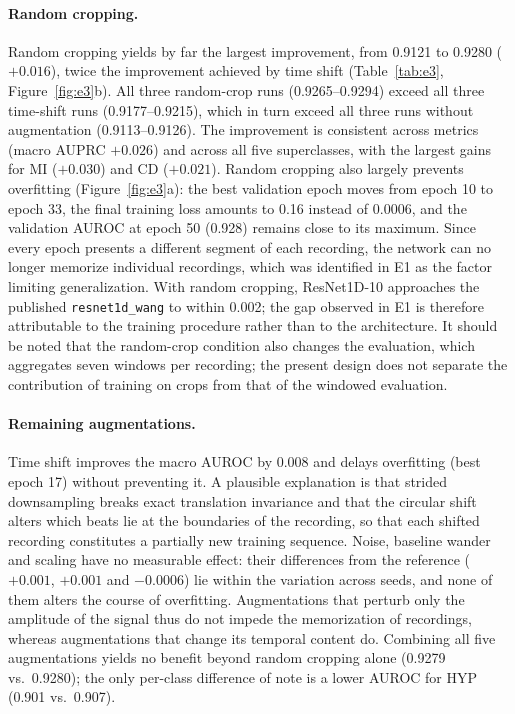 \documentclass{article}
\newcommand{\wang}{\texttt{resnet1d\_wang}}
\begin{document}
\paragraph{Random cropping.} Random cropping yields by far the largest improvement, from 0.9121 to 0.9280 ($+0.016$), twice the improvement achieved by time shift (Table~\ref{tab:e3}, Figure~\ref{fig:e3}b). All three random-crop runs (0.9265--0.9294) exceed all three time-shift runs (0.9177--0.9215), which in turn exceed all three runs without augmentation (0.9113--0.9126). The improvement is consistent across metrics (macro AUPRC $+0.026$) and across all five superclasses, with the largest gains for MI ($+0.030$) and CD ($+0.021$). Random cropping also largely prevents overfitting (Figure~\ref{fig:e3}a): the best validation epoch moves from epoch 10 to epoch 33, the final training loss amounts to 0.16 instead of 0.0006, and the validation AUROC at epoch 50 (0.928) remains close to its maximum. Since every epoch presents a different segment of each recording, the network can no longer memorize individual recordings, which was identified in E1 as the factor limiting generalization. With random cropping, ResNet1D-10 approaches the published \wang{} to within 0.002; the gap observed in E1 is therefore attributable to the training procedure rather than to the architecture. It should be noted that the random-crop condition also changes the evaluation, which aggregates seven windows per recording; the present design does not separate the contribution of training on crops from that of the windowed evaluation.

\paragraph{Remaining augmentations.} Time shift improves the macro AUROC by 0.008 and delays overfitting (best epoch 17) without preventing it. A plausible explanation is that strided downsampling breaks exact translation invariance and that the circular shift alters which beats lie at the boundaries of the recording, so that each shifted recording constitutes a partially new training sequence. Noise, baseline wander and scaling have no measurable effect: their differences from the reference ($+0.001$, $+0.001$ and $-0.0006$) lie within the variation across seeds, and none of them alters the course of overfitting. Augmentations that perturb only the amplitude of the signal thus do not impede the memorization of recordings, whereas augmentations that change its temporal content do. Combining all five augmentations yields no benefit beyond random cropping alone (0.9279 vs.\ 0.9280); the only per-class difference of note is a lower AUROC for HYP (0.901 vs.\ 0.907).
\end{document}
